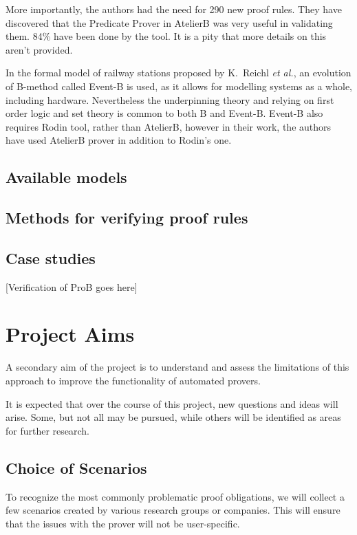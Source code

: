 \documentclass[11pt,journal]{IEEEtran}
\begin{document}
	More importantly, the authors had the need for 290 new proof rules. They have discovered that the Predicate Prover in AtelierB was very useful in validating them. 84\% have been done by the tool. It is a pity that more details on this aren't provided.
	
	In the formal model of railway stations proposed by K.~Reichl \emph{et al.}\cite{Railway routing}, an evolution of B-method called Event-B is used, as it allows for modelling systems as a whole, including hardware. Nevertheless the underpinning theory and relying on first order logic and set theory is common to both B and Event-B. Event-B also requires Rodin tool, rather than AtelierB, however in their work, the authors have used AtelierB prover in addition to Rodin's one.
	
	\subsection{Available models}
	
	\subsection{Methods for verifying proof rules}
	
	\subsection{Case studies}
	
	[Verification of ProB goes here]
	
	\section{Project Aims}
	
	A secondary aim of the project is to understand and assess the limitations of this approach to improve the functionality of automated provers.
	
	It is expected that over the course of this project, new questions and ideas will arise. Some, but not all may be pursued, while others will be identified as areas for further research.
	
	\subsection{Choice of Scenarios}
	To recognize the most commonly problematic proof obligations, we will collect a few scenarios created by various research groups or companies. This will ensure that the issues with the prover will not be user-specific. 
	
\end{document}
